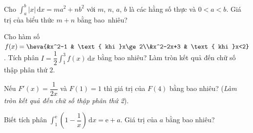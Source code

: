 \begin{bt}%
	Cho $\displaystyle\int_a^b \left|x\right| \mathrm{\,d}x = ma^2 +  nb^2$ với $m$, $n$, $a$, $b$ là các hằng số thực và $0 < a < b$. Giá trị của biểu thức $m + n$ bằng bao~nhiêu?
\end{bt}

\begin{bt}%
	Cho hàm số $f(x)=\heva{&x^2-1 & \text{ khi }x\ge 2\\&x^2-2x+3 &  \text{ khi }x<2}$. Tích phân $\displaystyle I=\dfrac{1}{2}\int_1^3f(x)\mathrm{\,d}x$ bằng bao nhiêu? Làm tròn kết quả đến chữ số thập phân thứ $2$.
\end{bt}

\begin{bt}%
	Nếu $F'(x)=\dfrac{1}{2x}$ và $F(1)=1$ thì giá trị  của $F(4)$ bằng bao nhiêu? (\textit{Làm tròn kết quả đến chữ số thập phân thứ 2}).
\end{bt}

\begin{bt}%
	Biết tích  phân $\displaystyle \int _1^{\mathrm{e}} \left(1-\dfrac{1}{x}\right) \mathrm{\,d}x=\mathrm{e}+a$. Giá trị của $a$ bằng bao nhiêu?
\end{bt}

